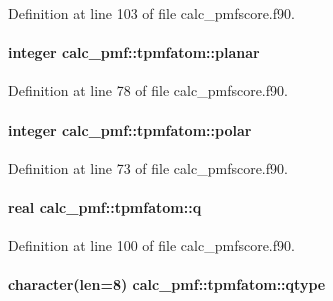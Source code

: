 Definition at line 103 of file calc\-\_\-pmfscore.\-f90.

\hypertarget{structcalc__pmf_1_1tpmfatom_a000cbd6dd4feccffaa9aeaa7ed78bb71}{
\paragraph[{planar}]{\setlength{\rightskip}{0pt plus 5cm}integer calc\-\_\-pmf\-::tpmfatom\-::planar}}\label{structcalc__pmf_1_1tpmfatom_a000cbd6dd4feccffaa9aeaa7ed78bb71}


Definition at line 78 of file calc\-\_\-pmfscore.\-f90.

\hypertarget{structcalc__pmf_1_1tpmfatom_a2a64b45b495bdf90bf1e3dcab58c5d44}{
\paragraph[{polar}]{\setlength{\rightskip}{0pt plus 5cm}integer calc\-\_\-pmf\-::tpmfatom\-::polar}}\label{structcalc__pmf_1_1tpmfatom_a2a64b45b495bdf90bf1e3dcab58c5d44}


Definition at line 73 of file calc\-\_\-pmfscore.\-f90.

\hypertarget{structcalc__pmf_1_1tpmfatom_a9279c0da2af81933064cc8729970d345}{
\paragraph[{q}]{\setlength{\rightskip}{0pt plus 5cm}real calc\-\_\-pmf\-::tpmfatom\-::q}}\label{structcalc__pmf_1_1tpmfatom_a9279c0da2af81933064cc8729970d345}


Definition at line 100 of file calc\-\_\-pmfscore.\-f90.

\hypertarget{structcalc__pmf_1_1tpmfatom_af441c18f6d6aa0098be350e3c553dad9}{
\paragraph[{qtype}]{\setlength{\rightskip}{0pt plus 5cm}character(len=8) calc\-\_\-pmf\-::tpmfatom\-::qtype}}\label{structcalc__pmf_1_1tpmfatom_af441c18f6d6aa0098be350e3c553dad9}


